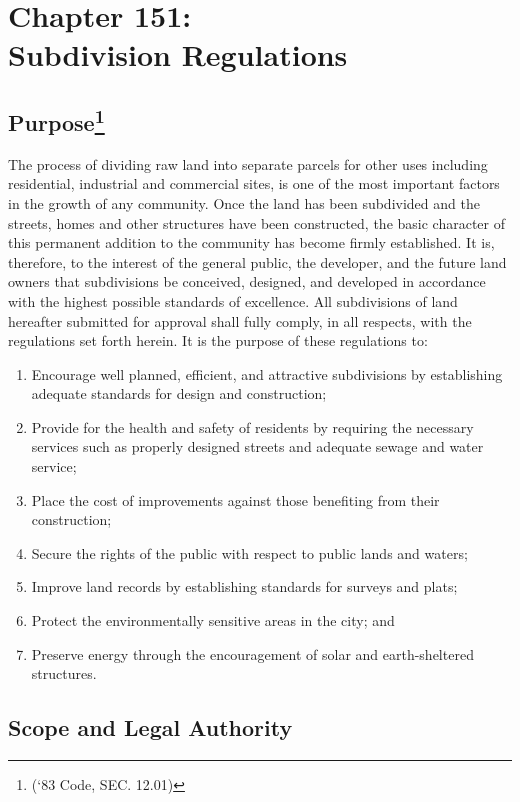 \chapter*{Chapter 151: \\
	Subdivision Regulations}
    \vfill
    \minitoc
    \pagebreak


\section{Purpose\footnote{(‘83 Code, SEC. 12.01)}}
The process of dividing raw land into separate parcels for other uses including residential, industrial and commercial sites, is one of the most important factors in the growth of any community. Once the land has been subdivided and the streets, homes and other structures have been constructed, the basic character of this permanent addition to the community has become firmly established. It is, therefore, to the interest of the general public, the developer, and the future land owners that subdivisions be conceived, designed, and developed in accordance with the highest possible standards of excellence. All subdivisions of land hereafter submitted for approval shall fully comply, in all respects, with the regulations set forth herein. It is the purpose of these regulations to:
\begin{enumerate}[{\indent}A)]
    \item Encourage well planned, efficient, and attractive subdivisions by establishing adequate standards for design and construction; 
    \item Provide for the health and safety of residents by requiring the necessary services such as properly designed streets and adequate sewage and water service; 
    \item Place the cost of improvements against those benefiting from their construction; 
    \item Secure the rights of the public with respect to public lands and waters; 
    \item Improve land records by establishing standards for surveys and plats; 
    \item Protect the environmentally sensitive areas in the city; and 
    \item Preserve energy through the encouragement of solar and earth-sheltered structures.
\end{enumerate}
\section{Scope and Legal Authority}
